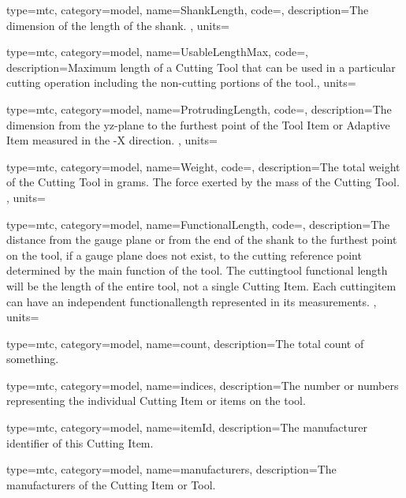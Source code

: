 {
  type=mtc,
  category=model,
  name={ShankLength},
  code=,
  description={The dimension of the length of the shank. },
  units=
}


{
  type=mtc,
  category=model,
  name={UsableLengthMax},
  code=,
  description={Maximum length of a Cutting Tool that can be used in a particular cutting operation including the non-cutting portions of the tool.},
  units=
}


{
  type=mtc,
  category=model,
  name={ProtrudingLength},
  code=,
  description={The dimension from the yz-plane to the furthest point of the Tool Item or Adaptive Item measured in the -X direction. },
  units=
}


{
  type=mtc,
  category=model,
  name={Weight},
  code=,
  description={The total weight of the Cutting Tool in grams. The force exerted by the mass of the Cutting Tool. },
  units=
}


{
  type=mtc,
  category=model,
  name={FunctionalLength},
  code=,
  description={The distance from the gauge plane or from the end of the shank to the furthest point on the tool, if a gauge plane does not exist, to the cutting reference point determined by the main function of the tool. The \gls{cuttingtool} functional length will be the length of the entire tool, not a single Cutting Item. Each \gls{cuttingitem} can have an independent \gls{functionallength} represented in its measurements. },
  units=
}


{
  type=mtc,
  category=model,
  name={count},
  description={The total count of something.}
}


{
  type=mtc,
  category=model,
  name={indices},
  description={The number or numbers representing the individual Cutting Item or items on the tool. }
}


{
  type=mtc,
  category=model,
  name={itemId},
  description={The manufacturer identifier of this Cutting Item. }
}


{
  type=mtc,
  category=model,
  name={manufacturers},
  description={The manufacturers of the Cutting Item or Tool. }
}


